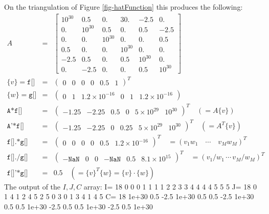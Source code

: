 \documentclass[a4paper,twoside,12pt]{book}
\begin{document}
\begin{example}
On the triangulation of Figure \ref{fig-hatFunction} this produces the following:
\begin{eqnarray*}
A&=&\left[\begin{array}{cccccc}
10^{30}&  0.5  & 0.    &3 0.    &  -2.5  & 0.     \\
0.     &10^{30}&0.5    & 0.     &0.5     &-2.5    \\
0.     &0.     &10^{30}& 0.     & 0.     &0.5     \\
0.5    & 0.    & 0.    & 10^{30}& 0.     & 0.     \\
-2.5   &0.5    & 0.    &0.5     &10^{30} &0.      \\
0.     &-2.5   &0.     & 0.     &0.5     & 10^{30}
\end{array}\right]
\\
\{v\}=\texttt{f[]}&=&
\left(
\begin{array}{rrrrrr}
0 & 0 & 0 & 0 & 0.5 & 1
\end{array}
\right)^T\\
\{w\}=\texttt{g[]}&=&
\left(
\begin{array}{rrrrrr}
0 &1  &1.2\times 10^{-16}& 0 & 1 & 1.2\times 10^{-16}
\end{array}
\right)\\
\texttt{A*f[]}&=&
\left(
\begin{array}{rrrrrr}
-1.25 &  -2.25 &  0.5   & 0 & 5\times 10^{29} & 10^{30}
\end{array}
\right)^T\quad (=A\{v\})\\
\texttt{A'*f[]}&=&
\left(
\begin{array}{rrrrrr}
-1.25 &  -2.25 &  0  & 0.25 & 5\times 10^{29} & 10^{30}
\end{array}
\right)^T\quad (=A^T\{v\})\\
\texttt{f[].*g[]}&=&
\left(
\begin{array}{rrrrrr}
0 & 0 & 0 & 0 & 0.5 & 1.2\times 10^{-16}
\end{array}
\right)^T\quad =(v_1w_1\quad\cdots\quad v_Mw_M)^T\\
\texttt{f[]./g[]}&=&
\left(
\begin{array}{rrrrrr}
-\mathtt{NaN} & 0  & 0  & -\mathtt{NaN}  & 0.5 & 8.1\times 10^{15}
\end{array}
\right)^T\quad =(v_1/w_1\,\cdots\, v_M/w_M)^T\\
\texttt{f[]'*g[]}&=&0.5\quad
(=\{v\}^T\{w\}=\{v\}\cdot\{w\})
\end{eqnarray*}
The output of the $I,J,C$ array:
\bFF
 I= 18
          0       0       0       1       1
          1       1       2       2       3
          3       4       4       4       4
          5       5       5
 J= 18
          0       1       4       1       2
          4       5       2       5       0
          3       0       1       3       4
          1       4       5
 C= 18
        1e+30   0.5     -2.5    1e+30   0.5
        0.5     -2.5    1e+30   0.5     0.5
        1e+30   -2.5    0.5     0.5     1e+30
        -2.5    0.5     1e+30
\eFF


\end{example}
\end{document}
